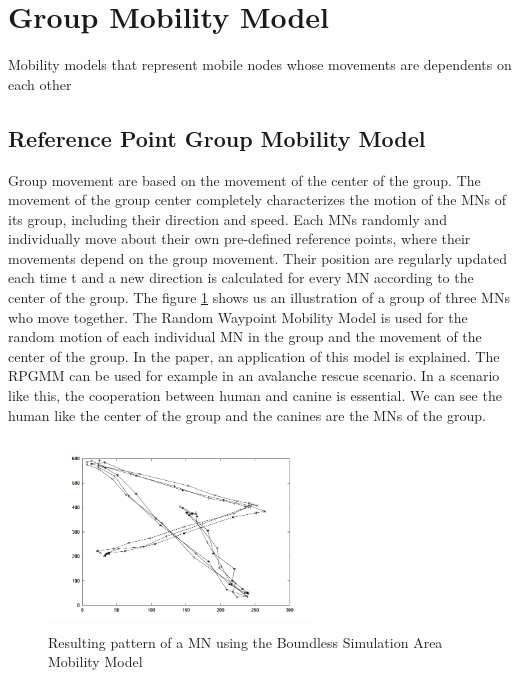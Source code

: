 \section{Group Mobility Model}

Mobility models that represent mobile nodes whose movements are dependents on each other

\subsection{Reference Point Group Mobility Model}

Group movement are based on the movement of the center of the group. The movement of the group center completely characterizes the motion of the MNs of its group, including their direction and speed. Each MNs randomly and individually move about their own pre-defined reference points, where their movements depend on the group movement. Their position are regularly updated each time t and a new direction is calculated for every MN according to the center of the group.
The figure \ref{RPGMMFig} shows us an illustration of a group of three MNs who move together. The Random Waypoint Mobility Model is used for the random motion of each individual MN in the group and the movement of the center of the group.
In the paper, an application of this model is explained. The RPGMM can be used for example in an avalanche rescue scenario. In a scenario like this, the cooperation between human and canine is essential. We can see the human like the center of the group and the canines are the MNs of the group.


\begin{figure}[h]
\center
\includegraphics[width=7cm,height=50mm]{../images/rpgmmodel1.png}
\caption{\label{RPGMMFig}Resulting pattern of a MN using the Boundless Simulation Area Mobility Model}
\end{figure}



